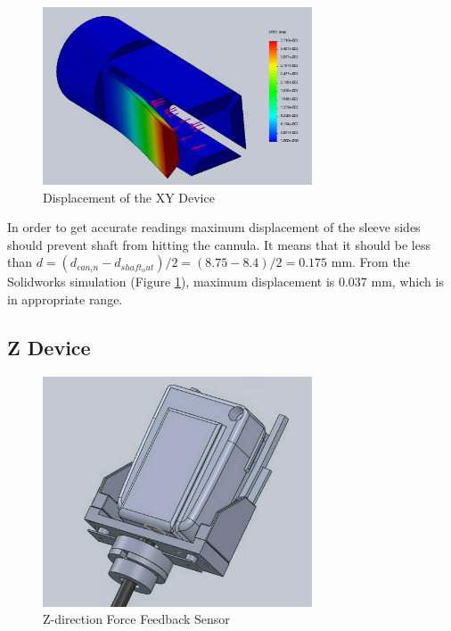 \begin{figure}[h]
	\begin{center}
		\includegraphics[width=80mm]{fig/methods/old_sleeve_displ.png}
	\end{center}
	\vspace{-4mm}
	\caption[Displacement of the XY Device]
	{Displacement of the XY Device}
	\label{fig:xy-displ}
	\vspace{-2mm}
\end{figure}

In order to get accurate readings maximum displacement of the sleeve sides should prevent shaft from hitting the cannula. It means that it should be less than $d=(d_{can_in} - d_{shaft_out})/2 = (8.75 - 8.4)/2 = 0.175$ mm. From the Solidworks simulation (Figure \ref{fig:xy-displ}), maximum displacement is 0.037 mm, which is in appropriate range.

\subsection{Z Device}
\label{sec:zDir}

\begin{figure}[h]
	\begin{center}
		\includegraphics[width=80mm]{fig/methods/z_dir_design.png}
	\end{center}
	\vspace{-4mm}
	\caption[Z-direction Force Feedback Sensor]
	{Z-direction Force Feedback Sensor}
	\label{fig:Z-direction}
	\vspace{-2mm}
\end{figure}

